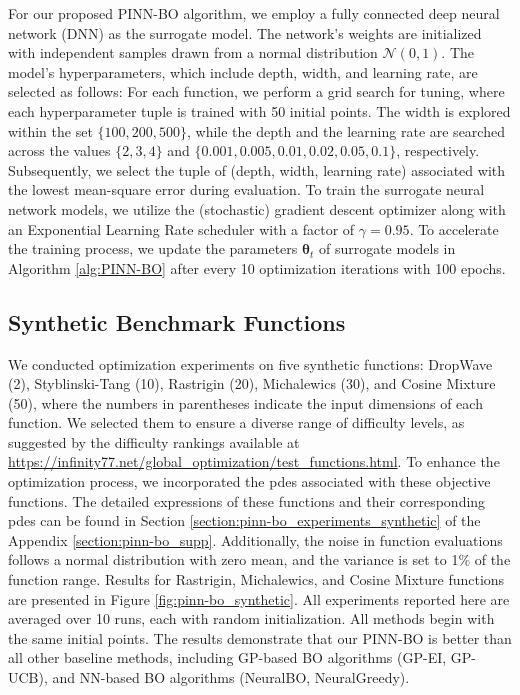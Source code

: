 For our proposed PINN-BO algorithm, we employ a fully connected deep neural network (DNN) as the surrogate model. The network's weights are initialized with independent samples drawn from a normal distribution $\mathcal{N} (0, 1)$. The model's hyperparameters, which include depth, width, and learning rate, are selected as follows: For each function, we perform a grid search for tuning, where each hyperparameter tuple is trained with 50 initial points. The width is explored within the set $\{100,200,500\}$, while the depth and the learning rate are searched across the values $\{2,3,4\}$ and $\{0.001, 0.005, 0.01, 0.02, 0.05, 0.1\}$, respectively.  Subsequently, we select the tuple of (depth, width, learning rate) associated with the lowest mean-square error during evaluation. To train the surrogate neural network models, we utilize the (stochastic) gradient descent optimizer along with an Exponential Learning Rate scheduler with a factor of $\gamma=0.95$. To accelerate the training process, we update the parameters $\boldsymbol{\theta}_t$ of surrogate models in Algorithm \ref{alg:PINN-BO} after every 10 optimization iterations with 100 epochs.  

\subsection{Synthetic Benchmark Functions}
 We conducted optimization experiments on five synthetic functions: DropWave (2), Styblinski-Tang (10), Rastrigin (20), Michalewics (30), and Cosine Mixture (50), where the numbers in parentheses indicate the input dimensions of each function. We selected them to ensure a diverse range of difficulty levels, as suggested by the difficulty rankings available at \url{https://infinity77.net/global_optimization/test_functions.html}. To enhance the optimization process, we incorporated the \acp{pde} associated with these objective functions. The detailed expressions of these functions and their corresponding \acp{pde} can be found in  Section \ref{section:pinn-bo_experiments_synthetic}  of the  Appendix \ref{section:pinn-bo_supp}. Additionally, the noise in function evaluations follows a normal distribution with zero mean, and the variance is set to 1\% of the function range. Results for Rastrigin, Michalewics, and Cosine Mixture functions are presented in Figure \ref{fig:pinn-bo_synthetic}.
All experiments reported here are averaged over 10 runs, each with random initialization. All methods begin with the same initial points. The results demonstrate that our PINN-BO is better than all other baseline methods, including GP-based BO algorithms (GP-EI, GP-UCB), and NN-based BO algorithms (NeuralBO, NeuralGreedy). 


